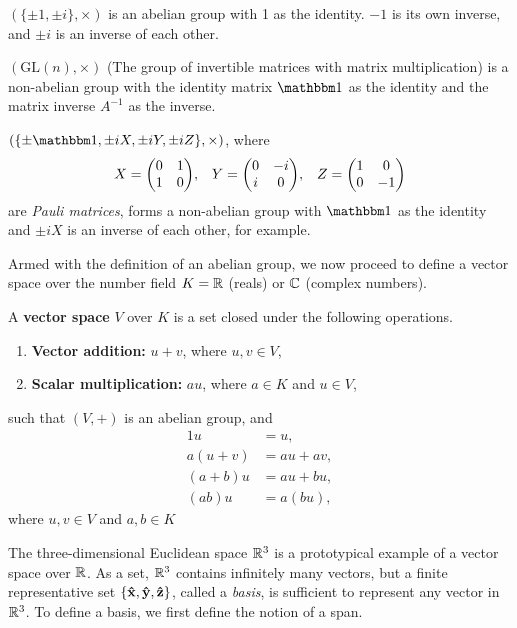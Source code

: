 \begin{example}
	$(\{\pm 1,\pm i\},\times)$ is an abelian group with 1 as the identity. $-1$ is its own inverse, and $\pm i$ is an inverse of each other.
\end{example}
\begin{example}
	$(\mathrm{GL}(n),\times)$ (The group of invertible matrices with matrix multiplication) is a non-abelian group with the identity matrix $\id$ as the identity and the matrix inverse $A^{-1}$ as the inverse.
\end{example}
\begin{example}\leavevmode
	\noindent $(\{\pm \id, \pm iX, \pm iY, \pm iZ\},\times)$, where
	\begin{align}\label{def:pauli}
		X=\mqty(0&1\\ 1&0), && Y=\mqty(0&-i\\ i&0), &&Z=\mqty(1&0\\0&-1)
	\end{align}
	are \emph{Pauli matrices}, forms a non-abelian group with $\id$ as the identity and $\pm iX$ is an inverse of each other, for example.
\end{example}

Armed with the definition of an abelian group, we now proceed to define a vector space over the number field $K=\mathbb R$ (reals) or $\mathbb C$ (complex numbers).
\begin{definition}
	A {\bf vector space} $V$ over $K$ is a set closed under the following  operations.
	\begin{enumerate}
		\item {\bf Vector addition:} $u+v$, where $u,v\in V$,
		\item {\bf Scalar multiplication:} $a u$, where $a\in K$ and $u\in V$,
	\end{enumerate}	 
	such that $(V,+)$ is an abelian group, and 
	\begin{align}
		1u &= u, \\
		a(u+v) &= a u + a v, \\
		(a +b) u &= a u + b u, \\
		(ab) u &= a(b u),	
	\end{align}
	where $u,v\in V$ and $a,b\in K$
\end{definition}

The three-dimensional Euclidean space $\mathbb R^3$ is a prototypical example of a vector space over $\mathbb R$. As a set, $\mathbb R^3$ contains infinitely many vectors, but a finite representative set $\{\bf \hat{x},\hat{y},\hat{z}\}$, called a \emph{basis}, is sufficient to represent any vector in $\mathbb R^3$. To define a basis, we first define the notion of a span.

